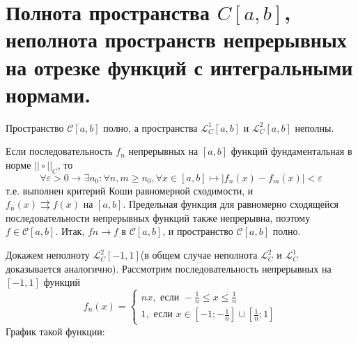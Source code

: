 \section{Полнота пространства $ C[a,b] $, неполнота пространств непрерывных на отрезке функций с интегральными нормами.}

\begin{greyTheorem}
	Пространство $ \mathcal{C}[a,b] $ полно, а пространства $ \mathcal{L}_C^1[a,b] $ и $ \mathcal{L}_C^2[a,b] $ неполны.
\end{greyTheorem}
\begin{greyProof}
	Если последовательность $ f_n $ непрерывных на $ [a,b] $ функций фундаментальная в норме $ ||\circ||_C $, то 
	\[
		\forall \varepsilon > 0 \rightarrow \exists n_0: \forall n,m \geqslant n_0, \forall x \in [a,b] \mapsto |f_n(x) - f_m(x)| < \varepsilon
	\]
	т.е. выполнен критерий Коши равномерной сходимости, и $ f_n(x) \rightrightarrows f(x)\text{ на } [a,b]$. Предельная функция для равномерно сходящейся последовательности непрерывных функций также непрерывна, поэтому $ f \in \mathcal{C}[a,b] $. Итак, $ fn \rightarrow f $ в $ \mathcal{C}[a,b] $, и пространство $ \mathcal{C}[a,b]  $ полно.
	
	Докажем неполноту $ \mathcal{L}_C^2[-1,1] $(в общем случае неполнота $ \mathcal{L}_C^2 $ и $ \mathcal{L}_C^1 $ доказывается аналогично). Рассмотрим последовательность непрерывных на $ [-1,1] $ функций
	\[
		f_n(x) = \begin{cases}
		nx, \text{ если } -\frac{1}{n}\leqslant x\leqslant\frac{1}{n}\\
		1, \text{ если } x \in \left[ -1;-\frac{1}{n} \right] \cup \left[ \frac{1}{n}; 1 \right]
		\end{cases}
	\]
	График такой функции:
	

\end{greyProof}
